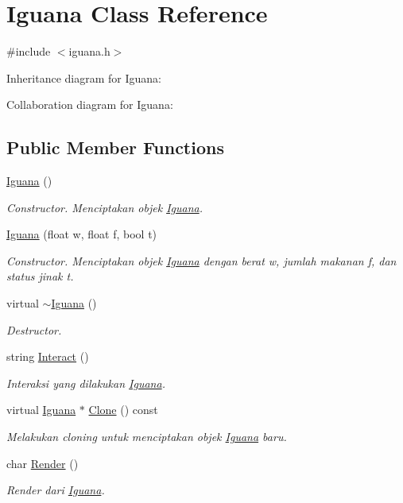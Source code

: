 \hypertarget{classIguana}{}\section{Iguana Class Reference}
\label{classIguana}


{\ttfamily \#include $<$iguana.\+h$>$}



Inheritance diagram for Iguana\+:


Collaboration diagram for Iguana\+:
\subsection*{Public Member Functions}
\begin{DoxyCompactItemize}
\item 
\hyperlink{classIguana_aadc10a5bb8364d915bfd1d3d8ab3156a}{Iguana} ()
\begin{DoxyCompactList}\small\item\em Constructor. Menciptakan objek \hyperlink{classIguana}{Iguana}. \end{DoxyCompactList}\item 
\hyperlink{classIguana_ae03d713eaadf2182168ce23f25ed36f8}{Iguana} (float w, float f, bool t)
\begin{DoxyCompactList}\small\item\em Constructor. Menciptakan objek \hyperlink{classIguana}{Iguana} dengan berat w, jumlah makanan f, dan status jinak t. \end{DoxyCompactList}\item 
virtual \hyperlink{classIguana_af0a4082cc22aea6f76f42c859d9375ad}{$\sim$\+Iguana} ()
\begin{DoxyCompactList}\small\item\em Destructor. \end{DoxyCompactList}\item 
string \hyperlink{classIguana_a271ef320fd3d4973e50e89aa30cffe3e}{Interact} ()
\begin{DoxyCompactList}\small\item\em Interaksi yang dilakukan \hyperlink{classIguana}{Iguana}. \end{DoxyCompactList}\item 
virtual \hyperlink{classIguana}{Iguana} $\ast$ \hyperlink{classIguana_a40e56fb855d09d2a8788dc73e2fdfc8a}{Clone} () const 
\begin{DoxyCompactList}\small\item\em Melakukan cloning untuk menciptakan objek \hyperlink{classIguana}{Iguana} baru. \end{DoxyCompactList}\item 
char \hyperlink{classIguana_a18bbb71a80e6b2a9855623b1c7f108b9}{Render} ()
\begin{DoxyCompactList}\small\item\em Render dari \hyperlink{classIguana}{Iguana}. \end{DoxyCompactList}\end{DoxyCompactItemize}
